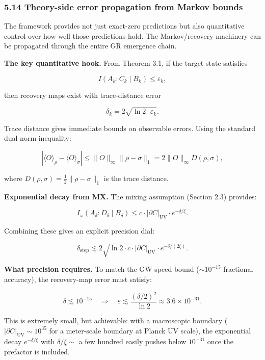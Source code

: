 \documentclass[
]{article}
\begin{document}
\subsubsection{5.14 Theory-side error propagation from Markov
bounds}\label{theory-side-error-propagation-from-markov-bounds}

The framework provides not just exact-zero predictions but also
quantitative control over how well those predictions hold. The
Markov/recovery machinery can be propagated through the entire GR
emergence chain.

\textbf{The key quantitative hook.} From Theorem 3.1, if the target
state satisfies

\[
I(A_k : C_k \mid B_k) \le \varepsilon_k,
\]

then recovery maps exist with trace-distance error

\[
\delta_k = 2\sqrt{\ln 2 \cdot \varepsilon_k}.
\]

Trace distance gives immediate bounds on observable errors. Using the
standard dual norm inequality:

\[
|\langle O \rangle_\rho - \langle O \rangle_\sigma|
\le \|O\|_\infty \|\rho - \sigma\|_1 = 2 \|O\|_\infty D(\rho, \sigma),
\]

where \(D(\rho, \sigma) = \frac{1}{2}\|\rho - \sigma\|_1\) is the trace
distance.

\textbf{Exponential decay from MX.} The mixing assumption (Section 2.3)
provides:

\[
I_\omega(A_\delta : D_\delta \mid B_\delta)
\le c \cdot |\partial C|_{\mathrm{UV}} \cdot e^{-\delta/\xi}.
\]

Combining these gives an explicit precision dial:

\[
\delta_{\mathrm{step}} \lesssim 2\sqrt{\ln 2 \cdot c \cdot |\partial C|_{\mathrm{UV}}}
\cdot e^{-\delta/(2\xi)}.
\]

\textbf{What precision requires.} To match the GW speed bound
(\(\sim 10^{-15}\) fractional accuracy), the recovery-map error must
satisfy:

\[
\delta \lesssim 10^{-15}
\quad \Rightarrow \quad
\varepsilon \lesssim \frac{(\delta/2)^2}{\ln 2} \approx 3.6 \times 10^{-31}.
\]

This is extremely small, but achievable: with a macroscopic boundary
(\(|\partial C|_{\mathrm{UV}} \sim 10^{35}\) for a meter-scale boundary
at Planck UV scale), the exponential decay \(e^{-\delta/\xi}\) with
\(\delta/\xi \sim\) a few hundred easily pushes below \(10^{-31}\) once
the prefactor is included.
\end{document}
